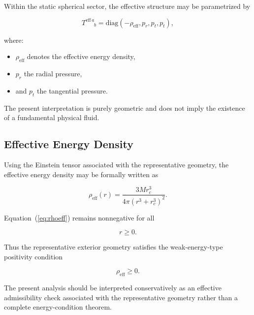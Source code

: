 Within the static spherical sector, the effective structure may be parametrized by

\begin{equation}
T^{\mathrm{eff}\,a}_{\phantom{\mathrm{eff}}\,\,\,\,b}
=
\mathrm{diag}
\left(
-\rho_{\mathrm{eff}},
p_r,
p_t,
p_t
\right),
\end{equation}

where:
\begin{itemize}[leftmargin=0.6cm]
\item $\rho_{\mathrm{eff}}$ denotes the effective energy density,
\item $p_r$ the radial pressure,
\item and $p_t$ the tangential pressure.
\end{itemize}

The present interpretation is purely geometric and does not imply the existence of a fundamental physical fluid.


\subsection{Effective Energy Density}

Using the Einstein tensor associated with the representative geometry, the effective energy density may be formally written as

\begin{equation}
\rho_{\mathrm{eff}}(r)
=
\frac{3Mr_c^3}
{4\pi (r^3+r_c^3)^2}.
\label{eq:rhoeff}
\end{equation}

Equation~(\ref{eq:rhoeff}) remains nonnegative for all

\begin{equation}
r \geq 0.
\end{equation}

Thus the representative exterior geometry satisfies the weak-energy-type positivity condition

\begin{equation}
\rho_{\mathrm{eff}} \geq 0.
\end{equation}

The present analysis should be interpreted conservatively as an effective admissibility check associated with the representative geometry rather than a complete energy-condition theorem.


